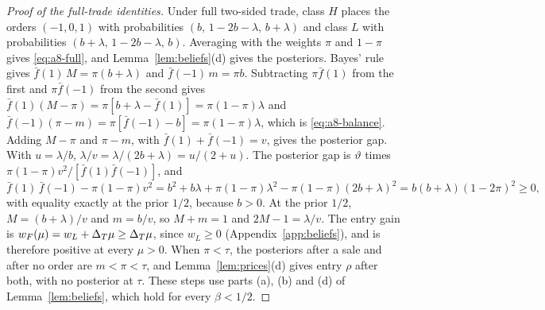 \begin{proof}[Proof of the full-trade identities]
Under full two-sided trade, class \(H\) places the orders \((-1,0,1)\) with probabilities \((b,\,1-2b-\lambda,\,b+\lambda)\)
and class \(L\) with probabilities \((b+\lambda,\,1-2b-\lambda,\,b)\). Averaging with the weights \(\pi\) and \(1-\pi\)
gives \eqref{eq:a8-full}, and Lemma~\ref{lem:beliefs}(d) gives the posteriors. Bayes' rule gives
\(\bar f(1)\,M=\pi(b+\lambda)\) and \(\bar f(-1)\,m=\pi b\). Subtracting \(\pi\bar f(1)\) from the first and
\(\pi\bar f(-1)\) from the second gives
\(\bar f(1)(M-\pi)=\pi[b+\lambda-\bar f(1)]=\pi(1-\pi)\lambda\) and
\(\bar f(-1)(\pi-m)=\pi[\bar f(-1)-b]=\pi(1-\pi)\lambda\), which is \eqref{eq:a8-balance}. Adding \(M-\pi\) and
\(\pi-m\), with \(\bar f(1)+\bar f(-1)=v\), gives the posterior gap. With \(u=\lambda/b\), \(\lambda/v=\lambda/(2b+\lambda)=u/(2+u)\).
The posterior gap is \(\vartheta\) times \(\pi(1-\pi)v^2/[\bar f(1)\bar f(-1)]\), and
\[
\bar f(1)\,\bar f(-1)-\pi(1-\pi)v^2=b^2+b\lambda+\pi(1-\pi)\lambda^2-\pi(1-\pi)(2b+\lambda)^2=b(b+\lambda)(1-2\pi)^2\ge0,
\]
with equality exactly at the prior \(1/2\), because \(b>0\). At the prior \(1/2\), \(M=(b+\lambda)/v\) and \(m=b/v\), so
\(M+m=1\) and \(2M-1=\lambda/v\). The entry gain is \(w_F(\mu)=w_L+\Delta_T\mu\ge\Delta_T\mu\), since \(w_L\ge0\) (Appendix~\ref{app:beliefs}),
and is therefore positive at every \(\mu>0\). When \(\pi<\tau\), the posteriors after a sale and after no order are
\(m<\pi<\tau\), and Lemma~\ref{lem:prices}(d) gives entry \(\rho\) after both, with no posterior at \(\tau\). These steps use
parts (a), (b) and (d) of Lemma~\ref{lem:beliefs}, which hold for every \(\beta<1/2\).
\end{proof}

